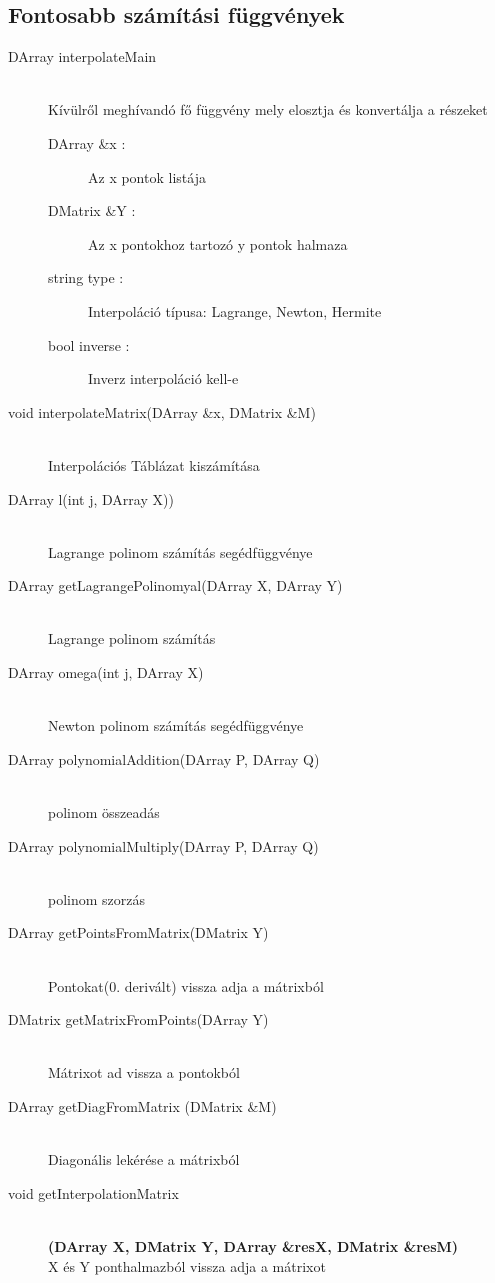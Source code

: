 \subsection{Fontosabb számítási függvények}
	\begin{description}
		\item[DArray interpolateMain] 
			\hfill \\ Kívülről meghívandó fő függvény mely elosztja és konvertálja a részeket
			\begin{description}
			  \item[DArray \&x :] Az x pontok listája 
			  \item[DMatrix \&Y :] Az x pontokhoz tartozó y pontok halmaza
			  \item[string type :] 
			  	Interpoláció típusa: Lagrange, Newton, Hermite
			  \item[bool inverse :] Inverz interpoláció kell-e
			\end{description}
		\item[void interpolateMatrix(DArray \&x, 	DMatrix \&M)] \hfill \\ 
			Interpolációs Táblázat kiszámítása
		\item[DArray l(int j, DArray X))] \hfill \\ 
			Lagrange polinom számítás segédfüggvénye
		\item[DArray getLagrangePolinomyal(DArray X, DArray Y)] \hfill \\ 
			Lagrange polinom számítás
		\item[DArray omega(int j, DArray X)] \hfill \\ 
			Newton polinom számítás segédfüggvénye
		\item[DArray polynomialAddition(DArray P, DArray Q)] \hfill \\ 
			polinom összeadás
		\item[DArray polynomialMultiply(DArray P, DArray Q)] \hfill \\ 
			polinom szorzás
		\item[DArray getPointsFromMatrix(DMatrix Y)] \hfill \\ 
			Pontokat(0. derivált) vissza adja a mátrixból
		\item[DMatrix getMatrixFromPoints(DArray Y)] \hfill \\ 
			Mátrixot ad vissza a pontokból
		\item[DArray getDiagFromMatrix (DMatrix \&M)] 
		\hfill \\
			Diagonális lekérése a mátrixból
		\item[void getInterpolationMatrix]
		\hfill \\  \textbf{(DArray X, DMatrix Y, DArray \&resX, DMatrix \&resM)}
		\hfill \\
			 X és Y ponthalmazból vissza adja a mátrixot 
	\end{description}
